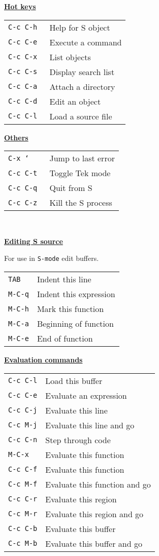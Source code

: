 \underline{\bf Hot keys} \\
\begin{tabular}{p{1.5cm}l}
{\tt C-c C-h }& Help for S object \\
{\tt C-c C-e }& Execute a command \\
{\tt C-c C-x }& List objects \\
{\tt C-c C-s }& Display search list \\
{\tt C-c C-a }& Attach a directory \\
{\tt C-c C-d }& Edit an object \\
{\tt C-c C-l }& Load a source file 
\end{tabular}

\underline{\bf Others}\\
\begin{tabular}{p{1.5cm}l}
{\tt C-x `   }& Jump to last error \\
{\tt C-c C-t }& Toggle Tek mode \\
{\tt C-c C-q }& Quit from S \\
{\tt C-c C-z }& Kill the S process
\end{tabular}\\[0.5cm]

\pagebreak

\underline{\large\bf Editing S source}

For use in {\tt S-mode} edit buffers.

\begin{tabular}{p{1.5cm}l}
{\tt TAB} & Indent this line \\
{\tt M-C-q} & Indent this expression \\
{\tt M-C-h} & Mark this function \\
{\tt M-C-a} & Beginning of function \\
{\tt M-C-e} & End of function 
\end{tabular}

\underline{\bf Evaluation commands}\\
\begin{tabular}{p{1.5cm}l}
{\tt C-c C-l} & Load this buffer \\
{\tt C-c C-e} & Evaluate an expression \\
{\tt C-c C-j} & Evaluate this line \\
{\tt C-c M-j} & Evaluate this line and go \\
{\tt C-c C-n} & Step through code \\
{\tt M-C-x}   & Evaluate this function \\
{\tt C-c C-f}   & Evaluate this function \\
{\tt C-c M-f}   & Evaluate this function and go \\
{\tt C-c C-r}   & Evaluate this region \\
{\tt C-c M-r}   & Evaluate this region and go \\
{\tt C-c C-b}   & Evaluate this buffer \\
{\tt C-c M-b}   & Evaluate this buffer and go \\
\end{tabular}


